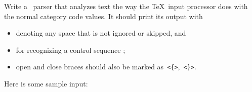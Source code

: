 Write a \lex\ parser that analyzes text the way the \TeX\ input
processor does with the normal category code values. It should print
its output with
\begin{itemize}
\item {} denoting any space that is not ignored or skipped, and
\item {} for recognizing a control sequence
  ;
\item open and close braces should also be marked
as~\verb+<{>+,~\verb+<}>+.
\end{itemize}
Here is some sample input:

